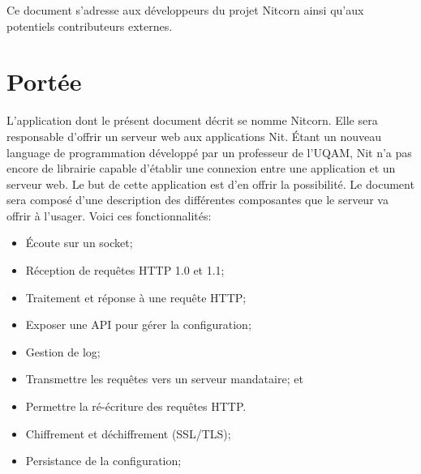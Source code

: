\documentclass{scrreprt}
\begin{document}
Ce document s'adresse aux développeurs du projet Nitcorn ainsi qu'aux potentiels
contributeurs externes.
\section{Portée}
L'application dont le présent document décrit se nomme Nitcorn. Elle sera responsable d'offrir un serveur web aux applications Nit. Étant un nouveau language de programmation développé par un professeur de l'UQAM, Nit n'a pas encore de librairie capable d'établir une connexion entre une application et un serveur web. Le but de cette application est d'en offrir la possibilité. Le document sera composé d'une description des différentes composantes que le serveur va offrir à l'usager. Voici ces fonctionnalités:
\begin{itemize}
    \item Écoute sur un socket;
    \item Réception de requêtes HTTP 1.0 et 1.1;
    \item Traitement et réponse à une requête HTTP;
    \item Exposer une API pour gérer la configuration;
    \item Gestion de log;
    \item Transmettre les requêtes vers un serveur mandataire; et
    \item Permettre la ré-écriture des requêtes HTTP.
    \item Chiffrement et déchiffrement (SSL/TLS);
    \item Persistance de la configuration;
\end{itemize}
\end{document}
